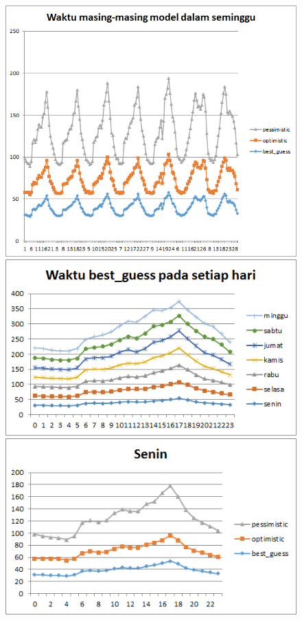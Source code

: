 			\newpage
			
					\begin{figure}[H]
				\centering		
				\includegraphics[scale=0.8]{Gambar/waktuallmodelsampel215052017.png}
				\includegraphics[]{Gambar/waktubestguesssampel215052017.png}
				\includegraphics[]{Gambar/seninsampel215052017.png}
			\end{figure}
			
